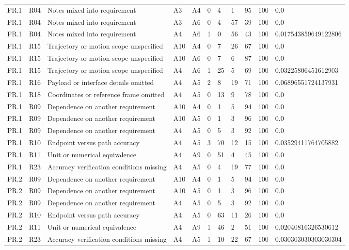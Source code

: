 \begin{tabular}{lllllllllll}
FR.1 & R04 & Notes mixed into requirement & A3 & A4 & 0 & 4 & 1 & 95 & 100 & 0.0 \\
FR.1 & R04 & Notes mixed into requirement & A3 & A6 & 0 & 4 & 57 & 39 & 100 & 0.0 \\
FR.1 & R04 & Notes mixed into requirement & A4 & A6 & 1 & 0 & 56 & 43 & 100 & 0.017543859649122806 \\
FR.1 & R15 & Trajectory or motion scope unspecified & A10 & A4 & 0 & 7 & 26 & 67 & 100 & 0.0 \\
FR.1 & R15 & Trajectory or motion scope unspecified & A10 & A6 & 0 & 7 & 6 & 87 & 100 & 0.0 \\
FR.1 & R15 & Trajectory or motion scope unspecified & A4 & A6 & 1 & 25 & 5 & 69 & 100 & 0.03225806451612903 \\
FR.1 & R16 & Payload or interface details omitted & A4 & A5 & 2 & 8 & 19 & 71 & 100 & 0.06896551724137931 \\
FR.1 & R18 & Coordinates or reference frame omitted & A4 & A5 & 0 & 13 & 9 & 78 & 100 & 0.0 \\
PR.1 & R09 & Dependence on another requirement & A10 & A4 & 0 & 1 & 5 & 94 & 100 & 0.0 \\
PR.1 & R09 & Dependence on another requirement & A10 & A5 & 0 & 1 & 3 & 96 & 100 & 0.0 \\
PR.1 & R09 & Dependence on another requirement & A4 & A5 & 0 & 5 & 3 & 92 & 100 & 0.0 \\
PR.1 & R10 & Endpoint versus path accuracy & A4 & A5 & 3 & 70 & 12 & 15 & 100 & 0.03529411764705882 \\
PR.1 & R11 & Unit or numerical equivalence & A4 & A9 & 0 & 51 & 4 & 45 & 100 & 0.0 \\
PR.1 & R23 & Accuracy verification conditions missing & A4 & A5 & 0 & 4 & 19 & 77 & 100 & 0.0 \\
PR.2 & R09 & Dependence on another requirement & A10 & A4 & 0 & 1 & 5 & 94 & 100 & 0.0 \\
PR.2 & R09 & Dependence on another requirement & A10 & A5 & 0 & 1 & 3 & 96 & 100 & 0.0 \\
PR.2 & R09 & Dependence on another requirement & A4 & A5 & 0 & 5 & 3 & 92 & 100 & 0.0 \\
PR.2 & R10 & Endpoint versus path accuracy & A4 & A5 & 0 & 63 & 11 & 26 & 100 & 0.0 \\
PR.2 & R11 & Unit or numerical equivalence & A4 & A9 & 1 & 46 & 2 & 51 & 100 & 0.02040816326530612 \\
PR.2 & R23 & Accuracy verification conditions missing & A4 & A5 & 1 & 10 & 22 & 67 & 100 & 0.030303030303030304 \\

\end{tabular}
